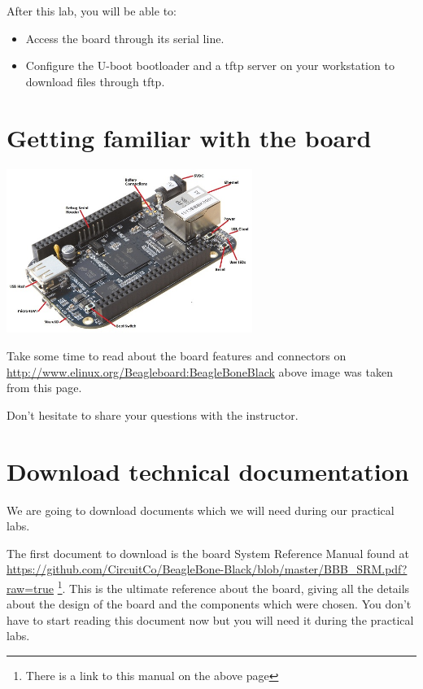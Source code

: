 
After this lab, you will be able to:
\begin{itemize}
\item Access the board through its serial line.
\item Configure the U-boot bootloader and a tftp server
      on your workstation to download files through tftp.
\end{itemize}

\section{Getting familiar with the board}

\begin{center}
\includegraphics[width=8cm]{labs/kernel-board-setup/beaglebone-black-connectors.jpg}
\end{center}

Take some time to read about the board features and connectors on
\url{http://www.elinux.org/Beagleboard:BeagleBoneBlack}
above image was taken from this page.

Don't hesitate to share your questions with the instructor.

\section{Download technical documentation}

We are going to download documents which we will need during our
practical labs.

The first document to download is the board System Reference Manual found at 
\url{https://github.com/CircuitCo/BeagleBone-Black/blob/master/BBB_SRM.pdf?raw=true}
\footnote{There is a link to this manual on the above page}.
This is the ultimate reference about the board, giving all the details
about the design of the board and the components which were chosen.
You don't have to start reading this document now but you will need it
during the practical labs.

